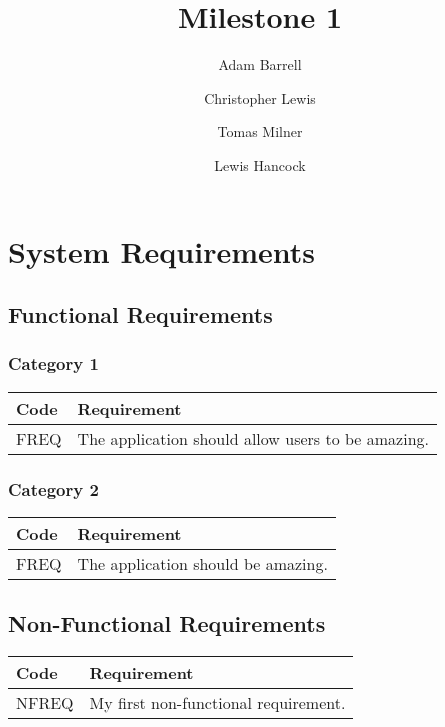 \documentclass[11pt,a4paper]{article}
\author{
  Adam Barrell\\
  \and
  Christopher Lewis\\
  \and
  Tomas Milner\\
  \and
  Lewis Hancock
}
\title{Milestone 1}
\newcounter{functionalcode}
\newcommand{\FReqId}{%
\addtocounter{functionalcode}{1}%
\arabic{functionalcode}}
\newcounter{nonfunctionalcode}
\newcommand{\NFReqId}{%
\addtocounter{nonfunctionalcode}{1}%
\arabic{nonfunctionalcode}}
\begin{document}
\maketitle


\section{System Requirements}

\subsection{Functional Requirements}

\renewcommand{\arraystretch}{1.5}%

\subsubsection{Category 1}

\begin{longtable}{p{1.7cm}p{13cm}}

\textbf{\large Code} & \textbf{\large Requirement} \\

\hline FREQ\FReqId & The application should allow users to be amazing.
\end{longtable}

\subsubsection{Category 2}

\begin{longtable}{p{1.7cm}p{13cm}}

\textbf{\large Code} & \textbf{\large Requirement} \\

\hline FREQ\FReqId & The application should be amazing.
\end{longtable}


\subsection{Non-Functional Requirements}

\renewcommand{\arraystretch}{1.5}%
\begin{longtable}{p{1.7cm}p{13cm}}
\textbf{\large Code} & \textbf{\large Requirement} \\
\hline NFREQ\NFReqId & My first non-functional requirement. \\
\hline 
\end{longtable} 
\end{document}
